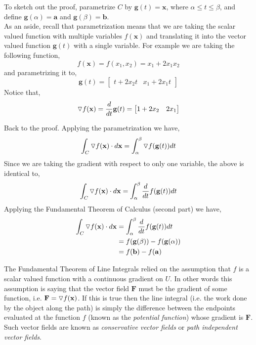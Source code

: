 \documentclass[12pt]{article}
\begin{document}
To sketch out the proof, parametrize $C$ by $\mathbf{g}(t)=\mathbf{x}$, where $\alpha\leq t\leq\beta$, and define $\mathbf{g}(\alpha)=\mathbf{a}$ and $\mathbf{g}(\beta)=\mathbf{b}$. \\ 

As an aside, recall that parametrization means that we are taking the scalar valued function with multiple variables $f(\mathbf{x})$ and translating it into the vector valued function $\mathbf{g}(t)$ with a single variable. For example we are taking the following function,
\[
f(\mathbf{x})=f(x_1,x_2) = x_1 + 2x_1x_2
\]
and parametrizing it to,
\[
\mathbf{g}(t) = \begin{bmatrix}t + 2x_2t & x_1 + 2x_1t\end{bmatrix}
\]
Notice that,
\[
\triangledown f(\mathbf{x}) = \frac{d}{dt}\mathbf{g}(t) =  \begin{bmatrix}1 + 2x_2 & 2x_1 \end{bmatrix}
\]

Back to the proof. Applying the parametrization we have,
\[
\int_C \triangledown f(\mathbf{x}) \cdot d\mathbf{x} = \int_{\alpha}^{\beta} \triangledown f(\mathbf{g}(t)) dt
\]
Since we are taking the gradient with respect to only one variable, the above is identical to,
\[
\int_C \triangledown f(\mathbf{x}) \cdot d\mathbf{x} = \int_{\alpha}^{\beta} \frac{d}{dt} f(\mathbf{g}(t)) dt
\]
Applying the Fundamental Theorem of Calculus (second part) we have,
\begin{align*}
\int_C \triangledown f(\mathbf{x}) \cdot d\mathbf{x} &= \int_{\alpha}^{\beta} \frac{d}{dt} f(\mathbf{g}(t)) dt \\
&= f(\mathbf{g}(\beta))-f(\mathbf{g}(\alpha)) \\
&= f(\mathbf{b})-f(\mathbf{a}) \\
\end{align*}

The Fundamental Theorem of Line Integrals relied on the assumption that $f$ is a scalar valued function with a continuous gradient on $U$. In other words this assumption is saying that the vector field $\mathbf{F}$ must be the gradient of some function, i.e. $\mathbf{F} = \triangledown f(\mathbf{x})$. If this is true then the line integral (i.e. the work done by the object along the path) is simply the difference between the endpoints evaluated at the function $f$ (known as the \emph{potential function}) whose gradient is $\mathbf{F}$. Such vector fields are known as \emph{conservative vector fields} or \emph{path independent vector fields}. \\
\end{document}

